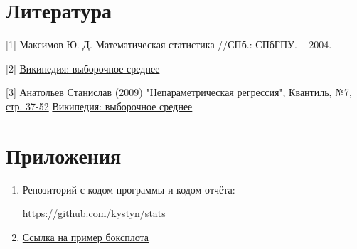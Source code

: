 \section{Литература}
[1] Максимов Ю. Д. Математическая статистика //СПб.: СПбГПУ. – 2004.

[2] \href{https://ru.wikipedia.org/wiki/%D0%92%D1%8B%D0%B1%D0%BE%D1%80%D0%BE%D1%87%D0%BD%D0%BE%D0%B5_%D1%81%D1%80%D0%B5%D0%B4%D0%BD%D0%B5%D0%B5}{Википедия: выборочное среднее}

[3]
\href{http://quantile.ru/07/07-SA.pdf}{Анатольев Станислав (2009) "Непараметрическая регрессия", Квантиль, №7, стр. 37-52} \href{https://ru.wikipedia.org/wiki/%D0%92%D1%8B%D0%B1%D0%BE%D1%80%D0%BE%D1%87%D0%BD%D0%BE%D0%B5_%D1%81%D1%80%D0%B5%D0%B4%D0%BD%D0%B5%D0%B5}{Википедия: выборочное среднее}

\section{Приложения}

\begin{enumerate}
	\item Репозиторий с кодом программы и кодом отчёта:
	
	\href{https://github.com/kystyn/stats}{https://github.com/kystyn/stats}
	
	\item \href{https://towardsdatascience.com/understanding-boxplots-5e2df7bcbd51}{Ссылка на пример боксплота}\label{bplotex}
\end{enumerate}